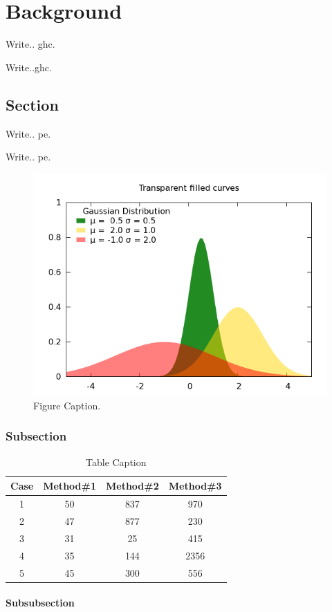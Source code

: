 \documentclass[../HWThesis.tex]{subfiles}
\begin{document}
\chapter{Background}
\label{ch:background}


Write.. \ac{ghc}.

Write..\ac{ghc}.


\section{Section}

Write.. \ac{pe}.

Write.. \ac{pe}.

\begin{figure}[H]
 \begin{center}
 \includegraphics [width=12cm]{fig/Background/pic.png}
 \caption{Figure Caption.}
 \label{fig:label}
\end{center}
\end{figure} 

\cite{gum, ghc-smp}

\subsection{Subsection}

\begin{table}[H]
\begin{center}
\begin{tabular}{c c c c} %
\hline\hline %
Case & Method\#1 & Method\#2 & Method\#3 \\ [0.5ex] %
\hline %
1 & 50 & 837 & 970 \\ %
2 & 47 & 877 & 230 \\
3 & 31 & 25 & 415 \\
4 & 35 & 144 & 2356 \\
5 & 45 & 300 & 556 \\ [1ex] %
\hline %
\end{tabular}\caption{Table Caption}
\label{tab:lable}
\end{center}
\end{table}


\subsubsection{Subsubsection}
\end{document}
